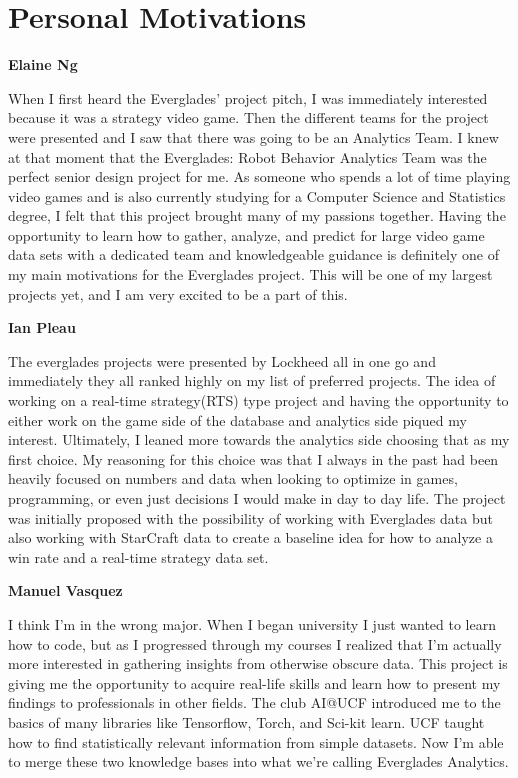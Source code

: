 \documentclass[a4paper,12pt]{report}
\newcommand{\msection}[1]{\noindent\textbf{#1}}
\begin{document}
\section{Personal Motivations}

\msection{Elaine Ng}

When I first heard the Everglades’ project pitch, I was immediately interested because it was a strategy video game. Then the different teams for the project were presented and I saw that there was going to be an Analytics Team. I knew at that moment that the Everglades: Robot Behavior Analytics Team was the perfect senior design project for me. As someone who spends a lot of time playing video games and is also currently studying for a Computer Science and Statistics degree, I felt that this project brought many of my passions together. Having the opportunity to learn how to gather, analyze, and predict for large video game data sets with a dedicated team and knowledgeable guidance is definitely one of my main motivations for the Everglades project. This will be one of my largest projects yet, and I am very excited to be a part of this.

\msection{Ian Pleau}

The everglades projects were presented by Lockheed all in one go and immediately they all ranked highly on my list of preferred projects. The idea of working on a real-time strategy(RTS) type project and having the opportunity to either work on the game side of the database and analytics side piqued my interest. Ultimately, I leaned more towards the analytics side choosing that as my first choice. My reasoning for this choice was that I always in the past had been heavily focused on numbers and data when looking to optimize in games, programming, or even just decisions I would make in day to day life. The project was initially proposed with the possibility of working with Everglades data but also working with StarCraft data to create a baseline idea for how to analyze a win rate and a real-time strategy data set.

\msection{Manuel Vasquez}

I think I’m in the wrong major. When I began university I just wanted to learn how to code, but as I progressed through my courses I realized that I’m actually more interested in gathering insights from otherwise obscure data. This project is giving me the opportunity to acquire real-life skills and learn how to present my findings to professionals in other fields. The club AI@UCF introduced me to the basics of many libraries like Tensorflow, Torch, and Sci-kit learn. UCF taught how to find statistically relevant information from simple datasets. Now I’m able to merge these two knowledge bases into what we’re calling Everglades Analytics.
\end{document}
